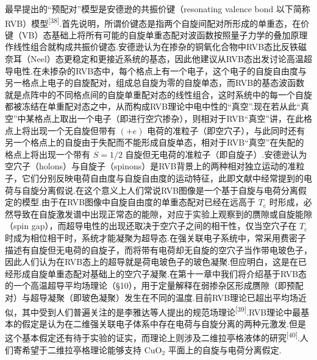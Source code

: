 最早提出的“预配对”模型是安德逊的共振价键（resonating valence bond 以下简称RVB）模型\textsuperscript{[38]}.首先说明，所谓价键态是指两个自旋间配对所形成的单重态，在价键（VB）态基础上将所有可能的自旋单重态配对波函数按照量子力学的叠加原理作线性组合就构成共振价键态.安德逊认为在掺杂的铜氧化合物中RVB态比反铁磁奈耳（Neel）态更稳定和更接近系统的基态，因此他建议从RVB态出发讨论高温超导电性.在未掺杂的RVB态中，每个格点上有一个电子，这个电子的自旋自由度与另一格点上电子的自旋配对，组成总自旋为零的自旋单态，而RVB的基态波函数就是点阵中的不同格点间的自旋单重配对态的线性组合，这时系统中的每一个自旋都被冻结在单重配对态之中，从而构成RVB理论中电中性的“真空”.现在若从此“真空”中某格点上取出一个电子（即进行空穴掺杂），则相对于RVB“真空”讲，在此格点上将出现一个无自旋但带有 $\left(+e\right)$ 电荷的准粒子（即空穴子），与此同时还有另一个格点上的自旋由于失配而不能形成自旋单态，相对于RVB“真空”在失配的格点上将出现一个带有 $S=1/2$ 自旋但无电荷的准粒子（即自旋子）.安德逊认为空穴子（holons）与自旋子（spinons）是RVB背景上的两种相对独立运动的准粒子，它们分别反映电荷自由度与自旋自由度的运动特征，此即文献中经常提到的电荷与自旋分离假说.在这个意义上人们常说RVB图像是一个基于自旋与电荷分离假定的模型.由于在RVB图像中自旋自由度的单重态配对已经在远高于 $T_{\mathrm{c}}$ 时形成，必然导致在自旋激发谱中出现正常态的能隙，对应于实验上观察到的赝隙或自旋能隙（spin gap），而超导电性的出现还取决于空穴子之间的相干性，仅当空穴子在 $T_{\mathrm{c}}$ 时成为相位相干时，系统才能凝聚为超导态.在强关联电子系统中，常采用费密子描述有自旋但无电荷的自旋子，而将带有电荷却无自旋的空穴子当作带电玻色子，因此人们认为在RVB态上的超导就是荷电玻色子的玻色凝聚.但应明白，这是在已经形成自旋单重态配对基础上的空穴子凝聚.在第十一章中我们将介绍基于RVB态的一个高温超导平均场理论（§10），用于定量解释在弱掺杂区形成赝隙（即预配对）与超导凝聚（即玻色凝聚）发生在不同的温度.目前RVB理论已超出平均场近似，其中受到人们普遍关注的是李雅达等人提出的规范场理论\textsuperscript{[39]}.RVB理论中最基本的假定是认为在二维强关联电子体系中存在电荷与自旋分离的两种元激发.但是这个基本假定还有待于实验的证实，而理论上则涉及二维拉亭格液体的研究\textsuperscript{[40]}.人们寄希望于二维拉亭格理论能够支持 $\mathrm{CuO}_{2}$ 平面上的自旋与电荷分离假定.

